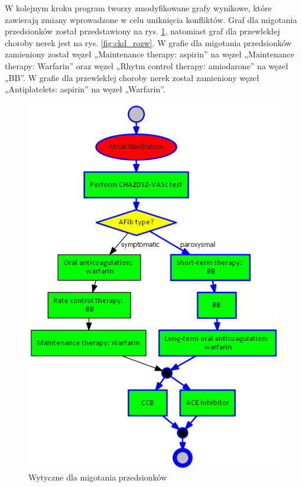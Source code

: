 W kolejnym kroku program tworzy zmodyfikowane grafy wynikowe, które zawierają zmiany wprowadzone w celu uniknięcia konfliktów. Graf dla migotania przedsionków został przedstawiony na rys. \ref{fig:afib_rozw}, natomiast graf dla przewlekłej choroby nerek jest na rys. \ref{fig:ckd_rozw}. W grafie dla migotania przedsionków zamieniony został węzeł „Maintenance therapy: aspirin” na węzeł „Maintenance therapy: Warfarin” oraz węzeł „Rhytm control therapy: amiodarone” na węzeł „BB”. W grafie dla przewlekłej choroby nerek został zamieniony węzeł „Antiplatelets: aspirin” na węzeł „Warfarin”.
\begin{figure}[H]
\centering
\includegraphics[scale=0.5]{img/rozwiazanie1afib-ver-4_przyklad.png}
\caption{Wytyczne dla migotania przedsionków}
\label{fig:afib_rozw}
\end{figure}
